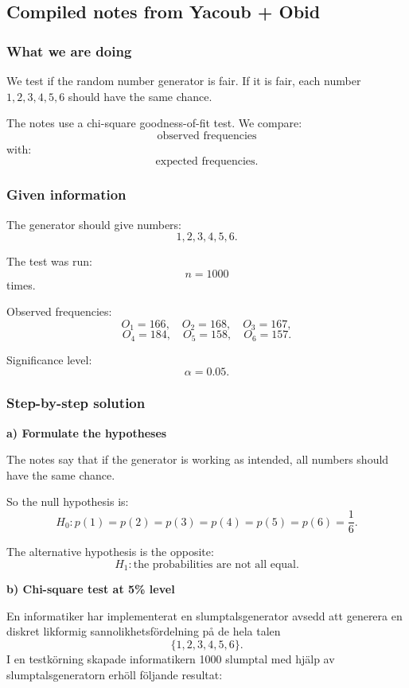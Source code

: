 \documentclass[10pt]{article}
\begin{document}
\subsection*{Compiled notes from Yacoub + Obid}

\subsubsection*{What we are doing}

We test if the random number generator is fair.
If it is fair, each number \(1,2,3,4,5,6\)
should have the same chance.

The notes use a chi-square goodness-of-fit test.
We compare:
\[
\text{observed frequencies}
\]
with:
\[
\text{expected frequencies}.
\]

\subsubsection*{Given information}

The generator should give numbers:
\[
1,2,3,4,5,6.
\]

The test was run:
\[
n=1000
\]
times.

Observed frequencies:
\[
O_1=166,\quad O_2=168,\quad O_3=167,
\]
\[
O_4=184,\quad O_5=158,\quad O_6=157.
\]

Significance level:
\[
\alpha=0.05.
\]

\subsubsection*{Step-by-step solution}

\textbf{a) Formulate the hypotheses}

The notes say that if the generator is working as
intended, all numbers should have the same chance.

So the null hypothesis is:
\[
H_0:
p(1)=p(2)=p(3)=p(4)=p(5)=p(6)
=\frac{1}{6}.
\]

The alternative hypothesis is the opposite:
\[
H_1:
\text{the probabilities are not all equal.}
\]

\textbf{b) Chi-square test at 5\% level}

En informatiker har implementerat en
slumptalsgenerator avsedd att generera en diskret
likformig sannolikhetsfördelning på de hela talen
\[
\{1,2,3,4,5,6\}.
\]
I en testkörning skapade informatikern 1000 slumptal
med hjälp av slumptalsgeneratorn erhöll följande
resultat:
\end{document}

